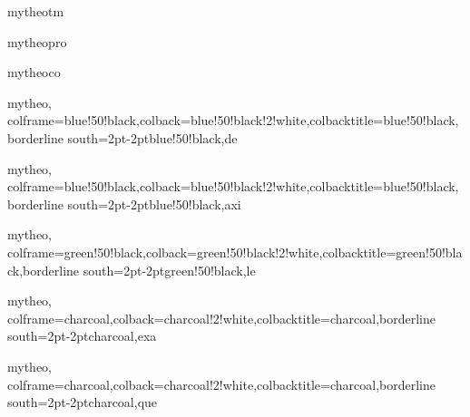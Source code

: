 
{mytheo}{tm}
\newcommand{\thmref}[1]{{\bfseries\sffamily Theorem~\ref{tm:#1}}}

{mytheo}{pro}
\newcommand{\propref}[1]{{\bfseries\sffamily Proposition~\ref{pro:#1}}}

{mytheo}{co}
\newcommand{\corref}[1]{{\bfseries\sffamily Corollary~\ref{co:#1}}}

{mytheo,
colframe=blue!50!black,colback=blue!50!black!2!white,colbacktitle=blue!50!black,borderline south={2pt}{-2pt}{blue!50!black},}{de}
\newcommand{\dfnref}[1]{{\bfseries\sffamily Definition~\ref{de:#1}}}

{mytheo,
colframe=blue!50!black,colback=blue!50!black!2!white,colbacktitle=blue!50!black,borderline south={2pt}{-2pt}{blue!50!black},}{axi}
\newcommand{\axref}[1]{{\bfseries\sffamily Axiom~\ref{axi:#1}}}

{mytheo,
colframe=green!50!black,colback=green!50!black!2!white,colbacktitle=green!50!black,borderline south={2pt}{-2pt}{green!50!black},}{le}
\newcommand{\lemref}[1]{{\bfseries\sffamily Lemma~\ref{le:#1}}}

{mytheo,
colframe=charcoal,colback=charcoal!2!white,colbacktitle=charcoal,borderline south={2pt}{-2pt}{charcoal},}{exa}
\newcommand{\exref}[1]{{\bfseries\sffamily Example~\ref{exa:#1}}}

{mytheo,
colframe=charcoal,colback=charcoal!2!white,colbacktitle=charcoal,borderline south={2pt}{-2pt}{charcoal},}{que}
\newcommand{\quref}[1]{{\bfseries\sffamily Question~\ref{que:#1}}}

